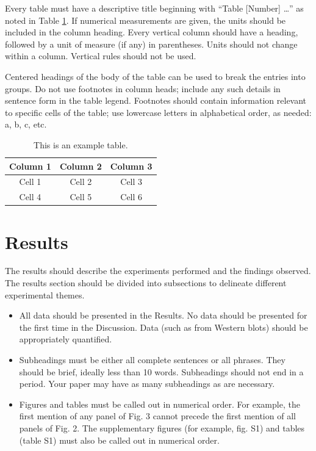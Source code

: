 \documentclass{article}
\begin{document}
Every table must have a descriptive title beginning with ``Table [Number] …'' as noted in Table \ref{tab:1}. If numerical measurements are given, the units should be included in the column heading. Every vertical column should have a heading, followed by a unit of measure (if any) in parentheses. Units should not change within a column. Vertical rules should not be used. 

Centered headings of the body of the table can be used to break the entries into groups. Do not use footnotes in column heads; include any such details in sentence form in the table legend. Footnotes should contain information relevant to specific cells of the table; use lowercase letters in alphabetical order, as needed: a, b, c, etc. 

\begin{table}[b]
    \caption{This is an example table.}    
    \centering
    \begin{tabular}{ccc}
            \hline
            Column 1 & Column 2 & Column 3 \\  
            \hline
            Cell 1 & Cell 2 & Cell 3\\ 
            Cell 4 & Cell 5 & Cell 6 \\
            \hline
            \end{tabular}

    \label{tab:1}
\end{table}

\section{Results}
The results should describe the experiments performed and the findings observed. The results section should be divided into subsections to delineate different experimental themes. 
\begin{itemize}
    \item All data should be presented in the Results. No data should be presented for the first time in the Discussion. Data (such as from Western blots) should be appropriately quantified.
    \item Subheadings must be either all complete sentences or all phrases. They should be brief, ideally less than 10 words. Subheadings should not end in a period. Your paper may have as many subheadings as are necessary.
    \item Figures and tables must be called out in numerical order. For example, the first mention of any panel of Fig. 3 cannot precede the first mention of all panels of Fig. 2. The supplementary figures (for example, fig. S1) and tables (table S1) must also be called out in numerical order. 
\end{itemize}
\end{document}
